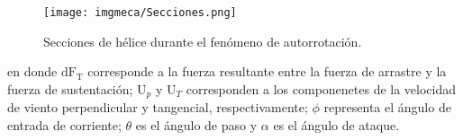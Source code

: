 \begin{figure}[H]
	\centering
	\texttt{[image: imgmeca/Secciones.png]}
	\caption{Secciones de h\'elice durante el fen\'omeno de autorrotaci\'on.}
	\label{img:Secciones}
\end{figure}

en donde $\text{dF}_{\text{T}}$ corresponde a la fuerza resultante entre la fuerza de arrastre y la fuerza de sustentaci\'on; $\text{U}_{p}$ y $\text{U}_{T}$ corresponden a los componenetes de la velocidad de viento perpendicular y tangencial, respectivamente; $\phi$ representa el \'angulo de entrada de corriente; $\theta$ es el \'angulo de paso y $\alpha$ es el \'angulo de ataque.
